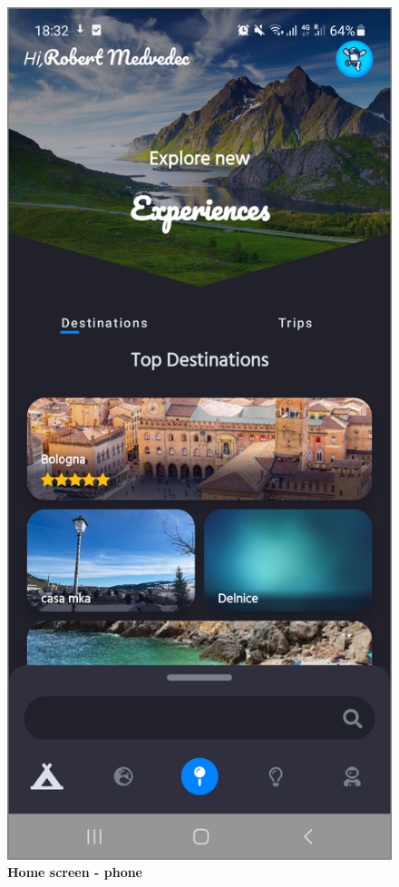 \begin{figure}[!htb]
\begin{minipage}{.45\textwidth}
\includegraphics[width=.8\textwidth]{../Images/UI/DestinationsMain.jpg}
\caption{\label{fig:dbapiuser}\textbf{Home screen - phone}}
\end{minipage}
\end{figure} 

